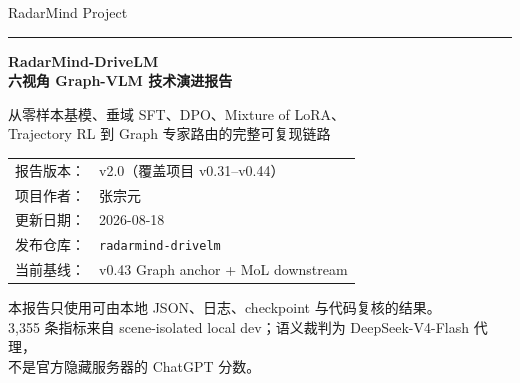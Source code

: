 \documentclass[UTF8,a4paper,11pt]{ctexart}
\begin{document}
\begin{titlepage}
  \pagecolor{RadarNavy}\color{white}
  \vspace*{1.0cm}
  {\sffamily\Large RadarMind Project\par}
  \vspace{0.35cm}
  {\noindent\color{RadarCyan}\rule{\textwidth}{2pt}\par}
  \vspace{1.25cm}
  {\sffamily\bfseries\fontsize{28}{36}\selectfont
  RadarMind-DriveLM\\[0.20em]六视角 Graph-VLM 技术演进报告\par}
  \vspace{0.75cm}
  {\sffamily\fontsize{17}{25}\selectfont
  从零样本基模、垂域 SFT、DPO、Mixture of LoRA、\\
  Trajectory RL 到 Graph 专家路由的完整可复现链路\par}
  \vfill
  \begin{tabular}{ll}
    报告版本：& v2.0（覆盖项目 v0.31--v0.44）\\
    项目作者：& 张宗元\\
    更新日期：& 2026-08-18\\
    发布仓库：& \texttt{radarmind-drivelm}\\
    当前基线：& v0.43 Graph anchor + MoL downstream\\
  \end{tabular}
  \vspace{1.0cm}

  {\small 本报告只使用可由本地 JSON、日志、checkpoint 与代码复核的结果。\\
  3,355 条指标来自 scene-isolated local dev；语义裁判为 DeepSeek-V4-Flash 代理，\\
  不是官方隐藏服务器的 ChatGPT 分数。\par}
\end{titlepage}
\nopagecolor\color{black}
\end{document}
